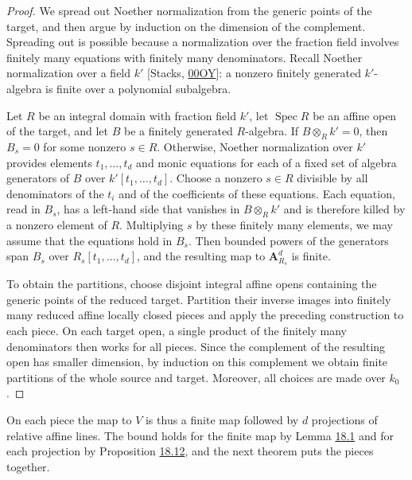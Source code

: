 \documentclass[11pt]{article}
\begin{document}
\begin{proof}[{Proof}]\label{bp313}%
We spread out Noether normalization from the generic points of the target, and then argue by induction on the dimension of the complement. Spreading out is possible because a normalization over the fraction field involves finitely many equations with finitely many denominators. Recall Noether normalization over a field \(k'\) [Stacks, \href{https://stacks.math.columbia.edu/tag/00OY}{00OY}]: a nonzero finitely generated \(k'\)-algebra is finite over a polynomial subalgebra.

Let \(R\) be an integral domain with fraction field \(k'\), let \(\operatorname{Spec}R\) be an affine open of the target, and let \(B\) be a finitely generated \(R\)-algebra. If \(B\otimes_Rk'=0\), then \(B_s=0\) for some nonzero \(s\in R\). Otherwise, Noether normalization over \(k'\) provides elements \(t_1,\ldots,t_d\) and monic equations for each of a fixed set of algebra generators of \(B\) over \(k'[t_1,\ldots,t_d]\). Choose a nonzero \(s\in R\) divisible by all denominators of the \(t_i\) and of the coefficients of these equations. Each equation, read in \(B_s\), has a left-hand side that vanishes in \(B\otimes_Rk'\) and is therefore killed by a nonzero element of \(R\). Multiplying \(s\) by these finitely many elements, we may assume that the equations hold in \(B_s\). Then bounded powers of the generators span \(B_s\) over \(R_s[t_1,\ldots,t_d]\), and the resulting map to \(\mathbf A^d_{R_s}\) is finite.

To obtain the partitions, choose disjoint integral affine opens containing the generic points of the reduced target. Partition their inverse images into finitely many reduced affine locally closed pieces and apply the preceding construction to each piece. On each target open, a single product of the finitely many denominators then works for all pieces. Since the complement of the resulting open has smaller dimension, by induction on this complement we obtain finite partitions of the whole source and target. Moreover, all choices are made over \(k_0\).
\end{proof}

\label{bp314}%
On each piece the map to \(V\) is thus a finite map followed by \(d\) projections of relative affine lines. The bound holds for the finite map by Lemma \hyperref[bp275]{18.1} and for each projection by Proposition \hyperref[bp308]{18.12}, and the next theorem puts the pieces together.
\end{document}
